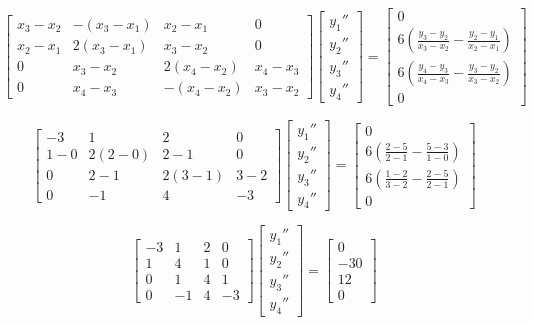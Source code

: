 \documentclass[11pt]{article} %
\begin{document}
$$\begin{bmatrix} x_3 - x_2 & -(x_3- x_1) & x_2 - x_1 & 0 \\ x_2 - x_1 & 2(x_3 - x_1) & x_3 - x_2 & 0 
		 \\ 0 & x_3 - x_2 & 2(x_4 - x_2) & x_4 - x_3 \\ 0 & x_4 - x_3 & -(x_4 - x_2) & x_3 - x_2
\end{bmatrix}
\begin{bmatrix} y_1'' \\ y_2'' \\ y_3'' \\ y_4'' \end{bmatrix} = 
\begin{bmatrix} 0 \\ 6\left( \frac{y_3 - y_2}{x_3 - x_2} - \frac{y_2-y_1}{x_2 - x_1} \right) \\ 
			 6\left( \frac{y_4 - y_3}{x_4 - x_3} - \frac{y_3-y_2}{x_3 - x_2} \right) \\ 0\end{bmatrix}$$

$$\begin{bmatrix} -3 & 1 & 2 & 0 \\ 1 - 0 & 2(2 -0) &2 -1 & 0 
		 \\ 0 & 2 - 1 & 2(3 -1) & 3 - 2 \\ 0 &  -1 & 4 & -3
\end{bmatrix}
\begin{bmatrix} y_1'' \\ y_2'' \\ y_3'' \\ y_4'' \end{bmatrix} = 
\begin{bmatrix} 0 \\  6\left( \frac{2 - 5}{2 - 1} - \frac{5-3}{1 - 0} \right) \\ 
			 6\left( \frac{1 - 2}{3 - 2} - \frac{2-5}{2 - 1} \right) \\ 0\end{bmatrix}$$

$$\begin{bmatrix} -3 & 1 & 2 & 0 \\ 1 & 4 &1 & 0 
		 \\ 0 & 1 & 4 & 1 \\  0 &  -1 & 4 & -3
\end{bmatrix}
\begin{bmatrix} y_1'' \\ y_2'' \\ y_3'' \\ y_4'' \end{bmatrix} = 
\begin{bmatrix} 0 \\ -30 \\ 12 \\ 0\end{bmatrix}$$
\end{document}
